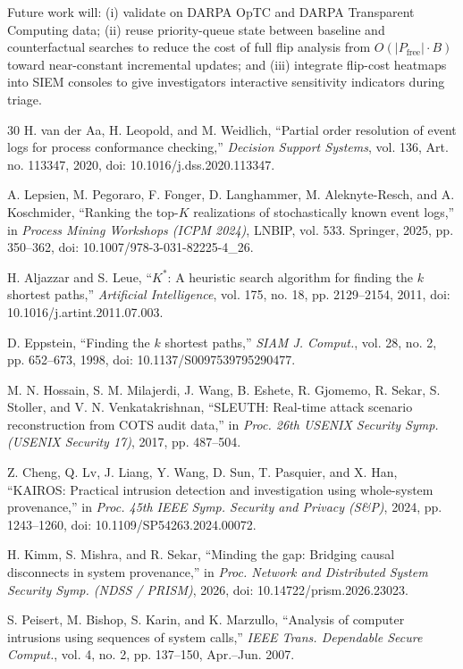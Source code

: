 \documentclass{ieeeaccess}
\newcommand{\Pfree}{P_{\mathrm{free}}}
\begin{document}
Future work will: (i) validate on DARPA OpTC and DARPA Transparent Computing data; (ii) reuse priority-queue state between baseline and counterfactual searches to reduce the cost of full flip analysis from $O(|\Pfree|\cdot B)$ toward near-constant incremental updates; and (iii) integrate flip-cost heatmaps into SIEM consoles to give investigators interactive sensitivity indicators during triage.


\balance
\begin{thebibliography}{30}
 H. van der Aa, H. Leopold, and M. Weidlich, ``Partial order resolution of event logs for process conformance checking,'' \emph{Decision Support Systems}, vol. 136, Art. no. 113347, 2020, doi: 10.1016/j.dss.2020.113347.

 A. Lepsien, M. Pegoraro, F. Fonger, D. Langhammer, M. Aleknyte-Resch, and A. Koschmider, ``Ranking the top-$K$ realizations of stochastically known event logs,'' in \emph{Process Mining Workshops (ICPM 2024)}, LNBIP, vol. 533. Springer, 2025, pp. 350--362, doi: 10.1007/978-3-031-82225-4\_26.

 H. Aljazzar and S. Leue, ``$K^*$: A heuristic search algorithm for finding the $k$ shortest paths,'' \emph{Artificial Intelligence}, vol. 175, no. 18, pp. 2129--2154, 2011, doi: 10.1016/j.artint.2011.07.003.

 D. Eppstein, ``Finding the $k$ shortest paths,'' \emph{SIAM J. Comput.}, vol. 28, no. 2, pp. 652--673, 1998, doi: 10.1137/S0097539795290477.

 M. N. Hossain, S. M. Milajerdi, J. Wang, B. Eshete, R. Gjomemo, R. Sekar, S. Stoller, and V. N. Venkatakrishnan, ``SLEUTH: Real-time attack scenario reconstruction from COTS audit data,'' in \emph{Proc. 26th USENIX Security Symp. (USENIX Security 17)}, 2017, pp. 487--504.

 Z. Cheng, Q. Lv, J. Liang, Y. Wang, D. Sun, T. Pasquier, and X. Han, ``KAIROS: Practical intrusion detection and investigation using whole-system provenance,'' in \emph{Proc. 45th IEEE Symp. Security and Privacy (S\&P)}, 2024, pp. 1243--1260, doi: 10.1109/SP54263.2024.00072.

 H. Kimm, S. Mishra, and R. Sekar, ``Minding the gap: Bridging causal disconnects in system provenance,'' in \emph{Proc. Network and Distributed System Security Symp. (NDSS / PRISM)}, 2026, doi: 10.14722/prism.2026.23023.

 S. Peisert, M. Bishop, S. Karin, and K. Marzullo, ``Analysis of computer intrusions using sequences of system calls,'' \emph{IEEE Trans. Dependable Secure Comput.}, vol. 4, no. 2, pp. 137--150, Apr.--Jun. 2007.


\end{thebibliography}
\end{document}
